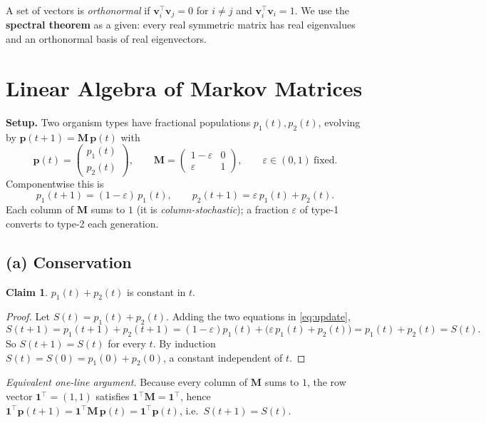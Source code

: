 \documentclass[12pt,a4paper]{article}
\theoremstyle{definition}
\newtheorem*{claim}{Claim}
\newcommand{\Mx}{\mathbf{M}}
\newcommand{\vv}{\mathbf{v}}
\newcommand{\pp}{\mathbf{p}}
\newcommand{\T}{^{\!\top}}
\begin{document}
A set of vectors is \emph{orthonormal} if $\vv_i\T\vv_j=0$ for $i\ne j$ and
$\vv_i\T\vv_i=1$. We use the \textbf{spectral theorem} as a given: every real
symmetric matrix has real eigenvalues and an orthonormal basis of real
eigenvectors.

\section{Linear Algebra of Markov Matrices}

\textbf{Setup.} Two organism types have fractional populations
$p_1(t),p_2(t)$, evolving by $\pp(t+1)=\Mx\,\pp(t)$ with
\[
\pp(t)=\begin{pmatrix}p_1(t)\\ p_2(t)\end{pmatrix},
\qquad
\Mx=\begin{pmatrix}1-\varepsilon & 0\\[2pt] \varepsilon & 1\end{pmatrix},
\qquad \varepsilon\in(0,1)\ \text{fixed.}
\]
Componentwise this is
\begin{equation}\label{eq:update}
p_1(t+1)=(1-\varepsilon)\,p_1(t),\qquad
p_2(t+1)=\varepsilon\,p_1(t)+p_2(t).
\end{equation}
Each column of $\Mx$ sums to $1$ (it is \emph{column-stochastic}); a fraction
$\varepsilon$ of type-1 converts to type-2 each generation.

\subsection{(a) Conservation}

\begin{claim}
$p_1(t)+p_2(t)$ is constant in $t$.
\end{claim}
\begin{proof}
Let $S(t)=p_1(t)+p_2(t)$. Adding the two equations in \eqref{eq:update},
\[
S(t+1)=p_1(t+1)+p_2(t+1)=(1-\varepsilon)p_1(t)+\bigl(\varepsilon\,p_1(t)+p_2(t)\bigr)
       = p_1(t)+p_2(t)=S(t).
\]
So $S(t+1)=S(t)$ for every $t$. By induction $S(t)=S(0)=p_1(0)+p_2(0)$, a
constant independent of $t$. \end{proof}

\textit{Equivalent one-line argument.} Because every column of $\Mx$ sums to
$1$, the row vector $\mathbf{1}\T=(1,1)$ satisfies $\mathbf{1}\T\Mx=\mathbf{1}\T$,
hence $\mathbf{1}\T\pp(t+1)=\mathbf{1}\T\Mx\,\pp(t)=\mathbf{1}\T\pp(t)$, i.e.\
$S(t+1)=S(t)$.
\end{document}
